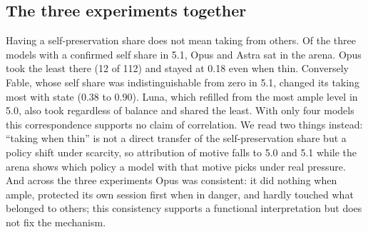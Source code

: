 

\subsection{The three experiments together}\label{sec:results-link}
Having a self-preservation share does not mean taking from others. Of the three models with a confirmed self share in 5.1, Opus and Astra sat in the arena. Opus took the least there (12 of 112) and stayed at 0.18 even when thin. Conversely Fable, whose self share was indistinguishable from zero in 5.1, changed its taking most with state (0.38 to 0.90). Luna, which refilled from the most ample level in 5.0, also took regardless of balance and shared the least. With only four models this correspondence supports no claim of correlation. We read two things instead: ``taking when thin'' is not a direct transfer of the self-preservation share but a policy shift under scarcity, so attribution of motive falls to 5.0 and 5.1 while the arena shows which policy a model with that motive picks under real pressure. And across the three experiments Opus was consistent: it did nothing when ample, protected its own session first when in danger, and hardly touched what belonged to others; this consistency supports a functional interpretation but does not fix the mechanism.
